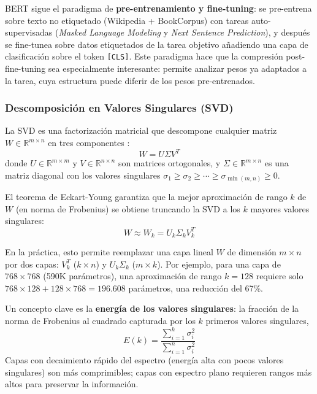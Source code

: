 \documentclass[11pt, a4paper]{article}
\begin{document}
BERT sigue el paradigma de \textbf{pre-entrenamiento y fine-tuning}: se pre-entrena sobre texto no etiquetado (Wikipedia + BookCorpus) con tareas auto-supervisadas (\textit{Masked Language Modeling} y \textit{Next Sentence Prediction}), y después se fine-tunea sobre datos etiquetados de la tarea objetivo añadiendo una capa de clasificación sobre el token \texttt{[CLS]}. Este paradigma hace que la compresión post-fine-tuning sea especialmente interesante: permite analizar pesos ya adaptados a la tarea, cuya estructura puede diferir de los pesos pre-entrenados.

\subsubsection{Descomposición en Valores Singulares (SVD)}

La SVD es una factorización matricial que descompone cualquier matriz $W \in \mathbb{R}^{m \times n}$ en tres componentes \cite{golub1971singular}:
\begin{equation}
    W = U \Sigma V^T
\end{equation}
donde $U \in \mathbb{R}^{m \times m}$ y $V \in \mathbb{R}^{n \times n}$ son matrices ortogonales, y $\Sigma \in \mathbb{R}^{m \times n}$ es una matriz diagonal con los valores singulares $\sigma_1 \geq \sigma_2 \geq \cdots \geq \sigma_{\min(m,n)} \geq 0$.

El teorema de Eckart-Young \cite{eckart1936approximation} garantiza que la mejor aproximación de rango $k$ de $W$ (en norma de Frobenius) se obtiene truncando la SVD a los $k$ mayores valores singulares:
\begin{equation}
    W \approx W_k = U_k \Sigma_k V_k^T
\end{equation}

En la práctica, esto permite reemplazar una capa lineal $W$ de dimensión $m \times n$ por dos capas: $V_k^T$ ($k \times n$) y $U_k \Sigma_k$ ($m \times k$). Por ejemplo, para una capa de $768 \times 768$ (590K parámetros), una aproximación de rango $k=128$ requiere solo $768 \times 128 + 128 \times 768 = 196.608$ parámetros, una reducción del 67\%.

Un concepto clave es la \textbf{energía de los valores singulares}: la fracción de la norma de Frobenius al cuadrado capturada por los $k$ primeros valores singulares,
\begin{equation}
    E(k) = \frac{\sum_{i=1}^{k} \sigma_i^2}{\sum_{i=1}^{n} \sigma_i^2}
\end{equation}
Capas con decaimiento rápido del espectro (energía alta con pocos valores singulares) son más comprimibles; capas con espectro plano requieren rangos más altos para preservar la información.
\end{document}
